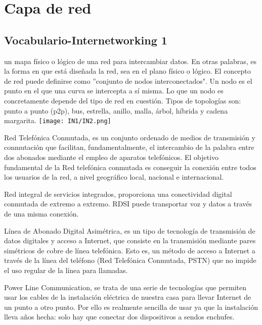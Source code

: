 \documentclass[
	12pt, %
	fleqn, %
	a4paper, %
]{LegrandOrangeBook}
\begin{document}
\chapter{Capa de red}

\newpage
\section*{Vocabulario-Internetworking 1}
\begin{vocabulary}
un mapa físico o lógico de una red para intercambiar datos. En otras palabras, es la forma en que está diseñada la red, sea en el plano físico o lógico. El concepto de red puede definirse como ''conjunto de nodos interconectados". Un nodo es el punto en el que una curva se intercepta a sí misma. Lo que un nodo es concretamente depende del tipo de red en cuestión. Tipos de topologías son: punto a punto (p2p), bus, estrella, anillo, malla, árbol, híbrida y cadena margarita.
\texttt{[image: IN1/IN2.png]}
\end{vocabulary}
\begin{vocabulary}[RTC]
Red Telefónica Conmutada, es un conjunto ordenado de medios de transmisión y conmutación que facilitan, fundamentalmente, el intercambio de la palabra entre dos abonados mediante el empleo de aparatos telefónicos. El objetivo fundamental de la Red telefónica conmutada es conseguir la conexión entre todos los usuarios de la red, a nivel geográfico local, nacional e internacional.
\end{vocabulary}
\begin{vocabulary}[RDSI]
Red integral de servicios integrados, proporciona una conectividad digital conmutada de extremo a extremo. RDSI puede transportar voz y datos a través de una misma conexión.
\end{vocabulary}
\begin{vocabulary}[ADSL]
Línea de Abonado Digital Asimétrica, es un tipo de tecnología de transmisión de datos digitales y acceso a Internet, que consiste en la transmisión mediante pares simétricos de cobre de línea telefónica. Esto es, un método de acceso a Internet a través de la línea del teléfono (Red Telefónica Conmutada, PSTN) que no impide el uso regular de la línea para llamadas.
\end{vocabulary}
\begin{vocabulary}[PLC]
Power Line Communication, se trata de una serie de tecnologías que permiten usar los cables de la instalación eléctrica de nuestra casa para llevar Internet de un punto a otro punto. Por ello es realmente sencilla de usar ya que la instalación lleva años hecha: solo hay que conectar dos dispositivos a sendos enchufes.
\end{vocabulary}
\end{document}
